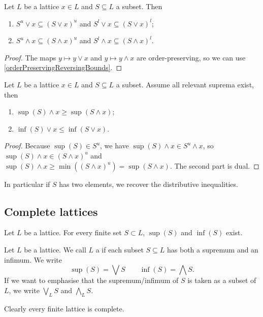 \begin{lemma} \label{UpperLowerBoundsMeetJoin}
Let $L$ be a lattice $x\in L$ and $S\subseteq L$ a subset. Then
\begin{enumerate}
\item $S^u\vee x \subseteq (S\vee x)^u$ and $S^l\vee x \subseteq (S\vee x)^l$;
\item $S^u\wedge x \subseteq (S\wedge x)^u$ and $S^l\wedge x \subseteq (S\wedge x)^l$.
\end{enumerate}
\end{lemma}
\begin{proof}
The maps $y\mapsto y\vee x$ and $y\mapsto y \wedge x$ are order-preserving, so we can use \ref{orderPreservingReversingBounds}.
\end{proof}
\begin{corollary} \label{infiniteDistributiveInequalities}
Let $L$ be a lattice $x\in L$ and $S\subseteq L$ a subset. Assume all relevant suprema exist, then
\begin{enumerate}
\item $\sup(S)\wedge x \geq \sup(S \wedge x)$;
\item $\inf(S)\vee x \leq \inf(S \vee x)$.
\end{enumerate}
\end{corollary}
\begin{proof}
Because $\sup(S)\in S^u$, we have $\sup(S)\wedge x \in S^u\wedge x$, so $\sup(S)\wedge x \in (S\wedge x)^u$ and $\sup(S)\wedge x \geq \min((S\wedge x)^u) = \sup(S\wedge x)$. The second part is dual.
\end{proof}
In particular if $S$ has two elements, we recover the distributive inequalities.


\subsection{Complete lattices}
\begin{lemma}
Let $L$ be a lattice. For every finite set $S\subset L$, $\sup(S)$ and $\inf(S)$ exist.
\end{lemma}
\begin{definition}
Let $L$ be a lattice. We call $L$ a  if each subset $S\subseteq L$ has both a supremum and an infimum. We write
\[ \sup(S) = \bigvee S \qquad \inf(S) = \bigwedge S. \]
If we want to emphasise that the supremum/infimum of $S$ is taken as a subset of $L$, we write $\bigvee_L S$ and $\bigwedge_L S$.
\end{definition}
Clearly every finite lattice is complete.

